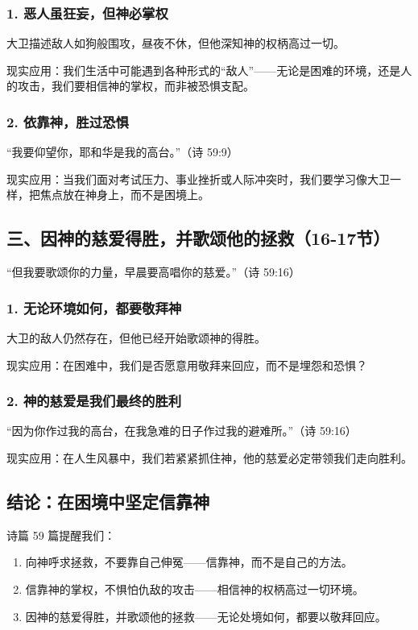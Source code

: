 \documentclass[a4paper, 12pt]{article}
\begin{document}
\subsubsection*{1. 恶人虽狂妄，但神必掌权}
\hspace{0.6cm}大卫描述敌人如狗般围攻，昼夜不休，但他深知神的权柄高过一切。

现实应用：我们生活中可能遇到各种形式的“敌人”——无论是困难的环境，还是人的攻击，我们要相信神的掌权，而非被恐惧支配。
\subsubsection*{2. 依靠神，胜过恐惧}
“我要仰望你，耶和华是我的高台。”（诗 59:9）

现实应用：当我们面对考试压力、事业挫折或人际冲突时，我们要学习像大卫一样，把焦点放在神身上，而不是困境上。
\subsection*{三、因神的慈爱得胜，并歌颂他的拯救（16-17节）}
“但我要歌颂你的力量，早晨要高唱你的慈爱。”（诗 59:16）

\subsubsection*{1. 无论环境如何，都要敬拜神}
\hspace{0.6cm}大卫的敌人仍然存在，但他已经开始歌颂神的得胜。

现实应用：在困难中，我们是否愿意用敬拜来回应，而不是埋怨和恐惧？
\subsubsection*{2. 神的慈爱是我们最终的胜利}
“因为你作过我的高台，在我急难的日子作过我的避难所。”（诗 59:16）

现实应用：在人生风暴中，我们若紧紧抓住神，他的慈爱必定带领我们走向胜利。
\subsection*{结论：在困境中坚定信靠神}
诗篇 59 篇提醒我们：
\begin{enumerate}
    \item 向神呼求拯救，不要靠自己伸冤——信靠神，而不是自己的方法。
    \item 信靠神的掌权，不惧怕仇敌的攻击——相信神的权柄高过一切环境。

    \item 因神的慈爱得胜，并歌颂他的拯救——无论处境如何，都要以敬拜回应。

\end{enumerate}
\end{document}
